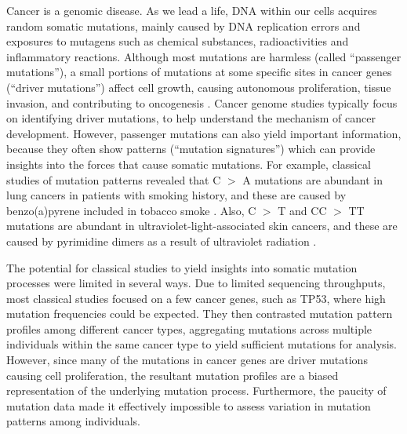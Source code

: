 \documentclass[10pt,letterpaper]{article}
\begin{document}
Cancer is a genomic disease. 
As we lead a life, DNA within our cells acquires random somatic mutations,
mainly caused by DNA replication errors and exposures to mutagens such as chemical substances, radioactivities and inflammatory reactions.  
Although most mutations are harmless (called ``passenger mutations''), 
a small portions of mutations at some specific sites in cancer genes (``driver mutations'') 
affect cell growth,
causing autonomous proliferation, tissue invasion, and contributing to oncogenesis \cite{stratton2009cancer}.
Cancer genome studies typically focus on identifying driver mutations, 
to help understand the mechanism of cancer development.
However, passenger mutations can also yield important information, 
because they often show patterns (``mutation signatures'') which 
can provide insights into the forces that cause somatic mutations.
For example, classical studies of mutation patterns
revealed that C $>$ A mutations are abundant in lung cancers in patients with smoking history,
and these are caused by benzo(a)pyrene included in tobacco smoke \cite{pmid12379884}.
Also, C $>$ T and CC $>$ TT  mutations are abundant in ultraviolet-light-associated skin cancers, 
and these are caused by pyrimidine dimers as a result of ultraviolet radiation \cite{pmid15748635}. 

The potential for classical studies to yield insights into somatic mutation processes
were limited in several ways.
Due to limited sequencing throughputs, most classical studies 
focused on a few cancer genes, such as TP53,
where high mutation frequencies could be expected. They then
contrasted mutation pattern profiles among different cancer types,
aggregating mutations across multiple individuals within the same cancer type to
yield sufficient mutations for analysis.
However, since many of the mutations in cancer genes are driver mutations causing cell proliferation,
the resultant mutation profiles are a biased representation of the underlying mutation process.
Furthermore, the paucity of mutation data made it effectively impossible to assess variation in mutation patterns among individuals.
\end{document}
